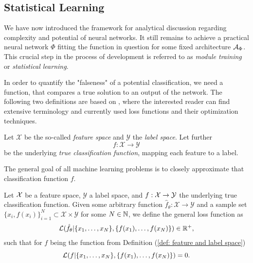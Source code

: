 \subsection{Statistical Learning} \label{subsec: statistical learning}




We have now introduced the framework for analytical discussion regarding complexity and potential of neural networks.
It still remains to achieve a practical neural network $\Phi$ fitting the 
function in question for some fixed
architecture $\mathcal{A}_\Phi$. This crucial step in the process of 
development is referred to as \emph{module training} or \emph{statistical learning}.

In order to quantify the "falseness" of a potential classification, we need a function, that compares a true solution
to an output of the network. The following two definitions are 
based on \cite{ciampiconi2024}, where the interested reader
can find extensive terminology and currently used loss functions and their optimization techniques. 

\begin{definition} \label{def: feature and label space}
    Let $\mathcal{X}$ be the so-called \emph{feature space} and $\mathcal{Y}$ the \emph{label space}. Let further
    \begin{equation*}
        f: \mathcal{X} \to \mathcal{Y}
    \end{equation*}
    be the underlying \emph{true classification function},
    mapping each feature to a label. 
\end{definition}
The general goal of all machine learning problems is to closely approximate that classification function $f$.

\begin{definition}
    Let $\mathcal{X}$ be a feature space, $\mathcal{Y}$ a label space, and $f:\mathcal{X} \to \mathcal{Y}$ the underlying true
    classification function.
    Given some arbitrary function $\hat f_\theta: \mathcal{X} \to \mathcal{Y}$ and a sample set
    $\{x_i, f(x_i)\}_{i=1}^N \subset \mathcal{X} \times \mathcal{Y}$ for some $N \in \mathbb{N}$, we define
    the general loss function as
    \begin{equation*}
        \mathcal{L}(\hat f_\theta \vert \{x_1, \dots, x_N\}, \{f(x_1), \dots, f(x_N)\}) \in \mathbb{R}^+,
    \end{equation*}
    such that for $f$ being the function from Definition (\ref{def: feature and label space})
    \begin{equation*}
        \mathcal{L}(f \vert \{x_1, \dots, x_N\}, \{f(x_1), \dots, f(x_N)\}) = 0.
    \end{equation*}
\end{definition}

